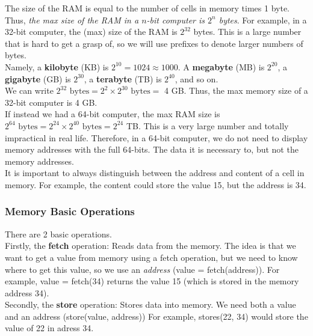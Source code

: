 \documentclass[]{article}
\begin{document}
The size of the RAM is equal to the number of cells in memory times 1 byte. Thus, \textit{the max size of the RAM in a $n$-bit computer is $2^n$ bytes}. For example, in a 32-bit computer, the (max) size of the RAM is $2^{32}$ bytes. This is a large number that is hard to get a grasp of, so we will use prefixes to denote larger numbers of bytes.\\

Namely, a \textbf{kilobyte} (KB) is $2^{10} = 1024 \approx 1000$. A \textbf{megabyte} (MB) is $2^{20}$, a \textbf{gigabyte} (GB) is $2^{30}$, a \textbf{terabyte} (TB) is $2^{40}$, and so on.\\

We can write $2^{32}\text{ bytes} = 2^{2} \times 2^{30}\text{ bytes} =$ 4 GB. Thus, the max memory size of a 32-bit computer is 4 GB.\\

If instead we had a 64-bit computer, the max RAM size is $2^{64}\text{ bytes} = 2^{24} \times 2^{40}\text{ bytes} = 2^{24}$ TB. This is a very large number and totally impractical in real life. Therefore, in a 64-bit computer, we do not need to display memory addresses with the full 64-bits. The data it is necessary to, but not the memory addresses.\\

It is important to always distinguish between the address and content of a cell in memory. For example, the content could store the value 15, but the address is 34. \\


\subsubsection{Memory Basic Operations}
\bigbreak

There are 2 basic operations. \\

Firstly, the \textbf{fetch} operation: Reads data from the memory. The idea is that we want to get a value from memory using a fetch operation, but we need to know where to get this value, so we use an \textit{address} (value = fetch(address)). For example, value = fetch(34) returns the value 15 (which is stored in the memory address 34).\\

Secondly, the \textbf{store} operation: Stores data into memory. We need both a value and an address (store(value, address)) For example, stores(22, 34) would store the value of 22 in adress 34.\\
\end{document}
